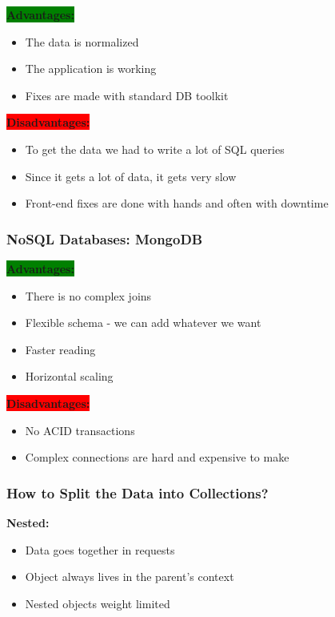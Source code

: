 \documentclass{article}
\begin{document}
\colorbox{green}{\textbf{Advantages:}}

\begin{itemize}
  \item The data is normalized 
  \item The application is working
  \item Fixes are made with standard DB toolkit
\end{itemize}

\colorbox{red}{\textbf{Disadvantages:}}

\begin{itemize}
  \item To get the data we had to write a lot of SQL queries
  \item Since it gets a lot of data, it gets very slow
  \item Front-end fixes are done with hands and often with downtime
\end{itemize}

\subsubsection{NoSQL Databases: MongoDB}
\noindent

\colorbox{green}{\textbf{Advantages:}}

\begin{itemize}
  \item There is no complex joins
  \item Flexible schema - we can add whatever we want
  \item Faster reading
  \item Horizontal scaling
\end{itemize}

\colorbox{red}{\textbf{Disadvantages:}}

\begin{itemize}
  \item No ACID transactions
  \item Complex connections are hard and expensive to make
\end{itemize}

\subsubsection{How to Split the Data into Collections?}
\noindent

\textbf{Nested:} 

\begin{itemize}
  \item Data goes together in requests
  \item Object always lives in the parent's context
  \item Nested objects weight limited
\end{itemize}
\end{document}
